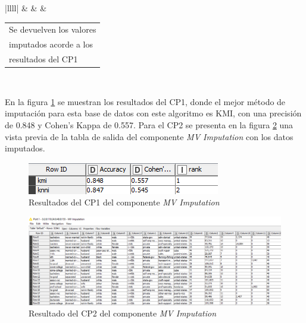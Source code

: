 \begin{table}[H]
\begin{spacing}{1.15}
{\begin{tabular}{|llll|}
			                                                                 &   &  & \begin{tabular}[c]{@{}l@{}}Se devuelven los valores\\ imputados acorde a los\\ resultados del CP1\end{tabular} \\ \hline
		\end{tabular}%
	}
	\end{spacing}
\end{table}

En la figura \ref{fig:comparacion-mvi} se muestran los resultados del CP1, donde el mejor método de imputación para esta base de datos con este algoritmo es KMI, con una precisión de 0.848 y Cohen's Kappa de 0.557. Para el CP2 se presenta en la figura \ref{fig:resultado-cp2-mvi} una vista previa de la tabla de salida del componente \textit{MV Imputation} con los datos imputados. 

\begin{figure}[H]
	\centering
	\includegraphics[width=0.5\linewidth]{"figuras/capi 3/pruebas-jenn/comparacion-mvi"}
	\caption{Resultados del CP1 del componente \textit{MV Imputation}}
	\label{fig:comparacion-mvi}
\end{figure}

\begin{figure}[H]
	\centering
	\includegraphics[width=0.8\linewidth]{"figuras/capi 3/pruebas-jenn/resultado-cp2-mvi"}
	\caption{Resultado del CP2 del componente \textit{MV Imputation}}
	\label{fig:resultado-cp2-mvi}
\end{figure}


